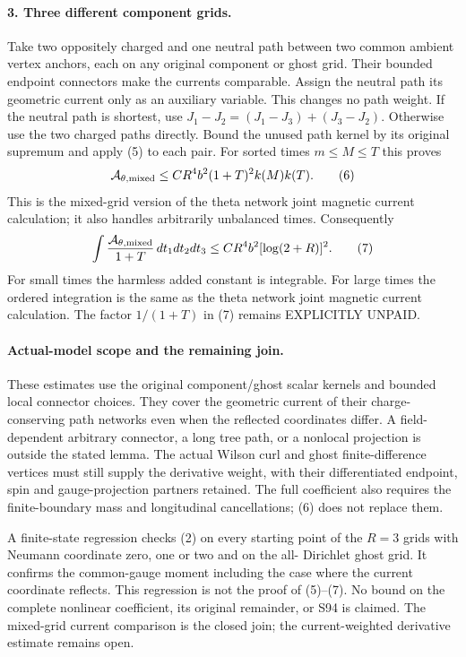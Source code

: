\documentclass[11pt]{article}
\begin{document}
\paragraph{3. Three different component grids.}
Take two oppositely charged and one neutral path between two common
ambient vertex anchors, each on any original component or ghost grid.
Their bounded endpoint connectors make the currents comparable.
Assign the neutral path its geometric current only as an auxiliary
variable. This changes no path weight.
If the neutral path is shortest, use
$J_1-J_2=(J_1-J_3)+(J_3-J_2)$.
Otherwise use the two charged paths directly.
Bound the unused path kernel by its original supremum and apply (5)
to each pair. For sorted times $m\le M\le T$ this proves
\[
 \mathcal A_{\theta,\rm mixed}
 \le CR^4b^2(1+T)^2 k(M)k(T).                                   \tag{6}
\]
This is the mixed-grid version of the theta network joint magnetic current calculation; it also handles
arbitrarily unbalanced times. Consequently
\[
 \int\frac{\mathcal A_{\theta,\rm mixed}}{1+T}\,dt_1dt_2dt_3
               \le CR^4b^2[\log(2+R)]^2.                        \tag{7}
\]
For small times the harmless added constant is integrable.
For large times the ordered integration is the same as the theta network joint magnetic current calculation.
The factor $1/(1+T)$ in (7) remains EXPLICITLY UNPAID.

\paragraph{Actual-model scope and the remaining join.}
These estimates use the original component/ghost scalar kernels and
bounded local connector choices. They cover the geometric current of
their charge-conserving path networks even when the reflected
coordinates differ. A field-dependent arbitrary connector, a long
tree path, or a nonlocal projection is outside the stated lemma.
The actual Wilson curl and ghost finite-difference vertices must still
supply the derivative weight, with their differentiated endpoint,
spin and gauge-projection partners retained. The full coefficient also
requires the finite-boundary mass and longitudinal cancellations;
(6) does not replace them.

A finite-state regression checks (2) on every starting point of the
$R=3$ grids with Neumann coordinate zero, one or two and on the all-
Dirichlet ghost grid. It confirms the common-gauge moment including
the case where the current coordinate reflects. This regression is
not the proof of (5)--(7).
No bound on the complete nonlinear coefficient, its original remainder,
or S94 is claimed. The mixed-grid current comparison is the closed
join; the current-weighted derivative estimate remains open.
\end{document}
